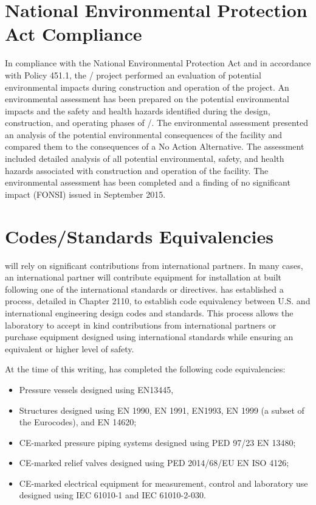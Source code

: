 \section{National Environmental Protection Act Compliance}

In compliance with the National Environmental Protection Act 
and in accordance with  Policy 451.1, the
/ project performed an evaluation of potential
environmental impacts during construction and operation of the
project.  An environmental assessment has been prepared on the potential environmental impacts and the safety and health
hazards identified during the design, construction, and operating
phases of /.  The environmental assessment presented an analysis of the potential
environmental consequences of the facility and compared them to the
consequences of a No Action Alternative. The assessment included
detailed analysis of all potential environmental, safety, and health
hazards associated with construction and operation of the facility.
The environmental assessment has been completed and a finding of no significant impact (FONSI)
issued in September 2015.

\section{Codes/Standards Equivalencies}
\label{sec:esh_codes}

 will rely on significant contributions from international
partners. In many cases, an international partner will contribute
equipment for installation at \fnal built following one of the
international standards or directives. \fnal has established a
process, detailed in  Chapter 2110, to establish code equivalency
between U.S. and international engineering design codes and
standards. This process allows the laboratory to accept in kind
contributions from international partners or purchase equipment
designed using international standards while ensuring an equivalent or
higher level of safety.

At the time of this writing, \fnal has completed the following code
equivalencies:
\begin{itemize}
 \item Pressure vessels designed using EN13445,
 \item Structures designed using EN 1990, EN 1991, EN1993, EN 1999 (a
   subset of the Eurocodes), and EN 14620;
 \item CE-marked pressure piping systems designed using PED 97/23 EN 13480;
 \item CE-marked relief valves designed using PED 2014/68/EU EN ISO 4126;
 \item CE-marked electrical equipment for measurement, control and
   laboratory use designed using IEC 61010-1 and IEC 61010-2-030.
\end{itemize}

